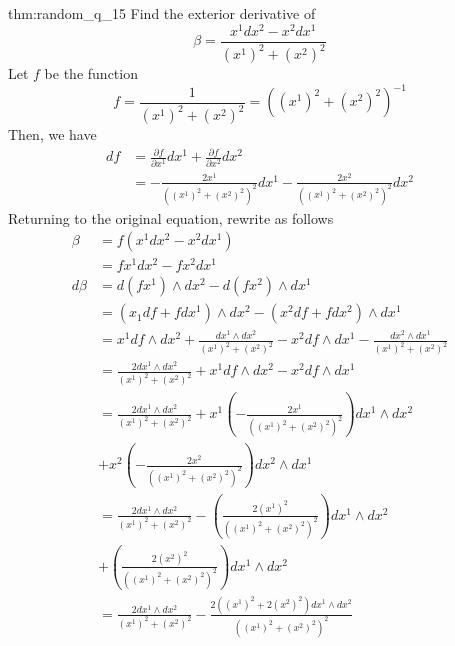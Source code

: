 \documentclass[landscape, 8pt]{extarticle}
\begin{document}
\begin{multicols}{3}
\begin{xmp}[random q]{thm:random_q_1}{5}
    Find the exterior derivative of
    \[\beta = \frac{x^{1}dx^{2} - x^{2}dx^{1}}{(x^{1})^{2} + (x^{2})^{2}}\]
    Let \(f\) be the function 
    \[\displaystyle f = \frac{1}{(x^{1})^{2} + (x^{2})^{2}} = ((x^{1})^{2} + (x^{2})^{2})^{-1}\]
    Then, we have 
    \begin{align*}
        df &= \displaystyle\frac{\partial f}{\partial x^{1}}dx^{1} + \frac{\partial f}{\partial x^{2}} dx^{2} \\
        &= - \frac{2x^{1}}{((x^{1})^{2} + (x^{2})^{2})^{2}}dx^{1} - \frac{2x^{2}}{((x^{1})^{2} + (x^{2})^{2})^{2}}dx^{2}
    \end{align*}
    Returning to the original equation, rewrite as follows
    \begin{align*}
        \beta &= f(x^{1}dx^{2} - x^{2}dx^{1}) \\
        &= fx^{1}dx^{2} - fx^{2}dx^{1} \\
        d\beta &= d(fx^{1}) \wedge dx^{2} - d(fx^{2}) \wedge dx^{1} \\
        &= (x_{1}df + fdx^{1}) \wedge dx^{2} - (x^{2}df + fdx^{2}) \wedge dx^{1} \\
        &= x^{1}df\wedge dx^{2} + \frac{dx^{1}\wedge dx^{2}}{(x^{1})^{2} + (x^{2})^{2}} - x^{2}df\wedge dx^{1} - \frac{dx^{2}\wedge dx^{1}}{(x^{1})^{2} + (x^{2})^{2}} \\
        &= \frac{2dx^{1}\wedge dx^{2}}{(x^{1})^{2} + (x^{2})^{2}} + x^{1}df\wedge dx^{2} - x^{2}df\wedge dx^{1} \\
        &= \frac{2dx^{1}\wedge dx^{2}}{(x^{1})^{2} + (x^{2})^{2}} + x^{1} \left(- \frac{2x^{1}}{((x^{1})^{2} + (x^{2})^{2})^{2}}\right)dx^{1} \wedge dx^{2} \\
        &+ x^{2} \left(- \frac{2x^{2}}{((x^{1})^{2} + (x^{2})^{2})^{2}}\right)dx^{2} \wedge dx^{1} \\
        &= \frac{2dx^{1}\wedge dx^{2}}{(x^{1})^{2} + (x^{2})^{2}} -  \left(\frac{2(x^{1})^{2}}{((x^{1})^{2} + (x^{2})^{2})^{2}}\right)dx^{1} \wedge dx^{2} \\
        &+ \left(\frac{2(x^{2})^{2}}{((x^{1})^{2} + (x^{2})^{2})^{2}}\right)dx^{1} \wedge dx^{2} \\
        &= \frac{2dx^{1}\wedge dx^{2}}{(x^{1})^{2} + (x^{2})^{2}} -  \frac{2((x^{1})^{2} + 2(x^{2})^{2})dx^{1} \wedge dx^{2}}{((x^{1})^{2} + (x^{2})^{2})^{2}} \\ 
    \end{align*}
    

\end{xmp}
\vspace{-5pt}




\end{multicols}
\end{document}
